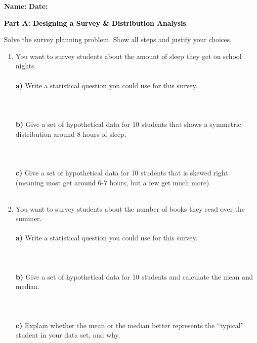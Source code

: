 \documentclass[12pt, letterpaper, fleqn]{article}
\begin{document}
\textbf{Name:} \underline{\hspace{5cm}}
\hfill
\textbf{Date:} \underline{\hspace{3cm}}\\

\begin{tcolorbox}[colback=black!10]
    \large\textcolor{black}{\textbf{Part A: Designing a Survey \& Distribution Analysis}}
\end{tcolorbox}

\vspace{3mm}

\noindent
Solve the survey planning problem. Show all steps and justify your choices.

\vspace{5mm}

\begin{enumerate}[itemsep=0.5cm, leftmargin=0.6cm]
\item You want to survey students about the amount of sleep they get on school nights.  \\ \\ 
\textbf{a)} Write a statistical question you could use for this survey. \\ \\
 \\ \\
\textbf{b)} Give a set of hypothetical data for 10 students that shows a symmetric distribution around 8 hours of sleep. \\ \\
 \\ \\
\textbf{c)} Give a set of hypothetical data for 10 students that is skewed right (meaning most get around 6-7 hours, but a few get much more). \\ \\


\item You want to survey students about the number of books they read over the summer. \\ \\
\textbf{a)} Write a statistical question you could use for this survey. \\ \\
 \\ \\
\textbf{b)} Give a set of hypothetical data for 10 students and calculate the mean and median. \\ \\
 \\ \\
\textbf{c)} Explain whether the mean or the median better represents the ``typical'' student in your data set, and why. \\ \\

\end{enumerate}
\end{document}
